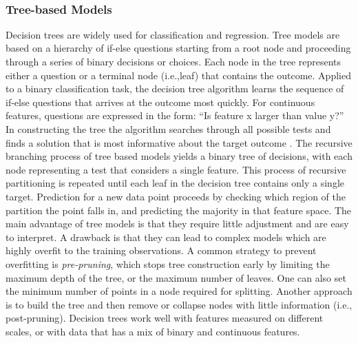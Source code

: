 \\\documentclass[sigconf]{acmart}
\begin{document}
\subsubsection{Tree-based Models} Decision trees are widely used for 
classification and regression. Tree models are based on a hierarchy of 
if-else questions starting from a root node and proceeding through a series 
of binary decisions or choices. Each node in the tree represents either a 
question or a terminal node (i.e.,leaf) that contains the outcome. Applied to 
a binary classification task, the decision tree algorithm learns the sequence
of if-else questions that arrives at the outcome most quickly. For continuous 
features, questions are expressed in the form: ``Is feature x larger than 
value y?'' In constructing the tree the algorithm searches through all 
possible tests and finds a solution that is most informative about the target 
outcome \cite{muller17}. The recursive branching process of tree based models 
yields a binary tree of decisions, with each node representing a test that 
considers a single feature. This process of recursive partitioning is repeated 
until each leaf in the decision tree contains only a single target. Prediction 
for a new data point proceeds by checking which region of the partition the 
point falls in, and predicting the majority in that feature space. The main 
advantage of tree models is that they require little adjustment and are easy 
to interpret. A drawback is that they can lead to complex models which are 
highly overfit to the training observations. A common strategy to prevent 
overfitting is \emph{pre-pruning}, which stops tree construction early by 
limiting the maximum depth of the tree, or the maximum number of leaves. 
One can also set the minimum number of points in a node required for splitting. Another approach is to build the tree and then remove or collapse nodes with 
little information (i.e., post-pruning). Decision trees work well with 
features measured on different scales, or with data that has a mix of 
binary and continuous features. 

\end{document}
